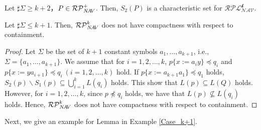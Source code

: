 \begin{col}
Let $\sharp\Sigma \ge k+2$，$P \in \mathcal{RP}^{+}_{N\!A\!V}$.
Then, $S_{2}(P)$ is a characteristic set for $\mathcal{RPL^{\mbox{$k$}}_{NAV}}$.
\end{col}

\begin{lem}\label{Case_k+2}\label{k+2のとき}
Let $\sharp\Sigma \le k+1$.
Then, $\mathcal{RP}^{k}_{N\!A\!V}$ does not have compactness with respect to containment.
\end{lem}
\begin{proof}
Let $\Sigma$ be the set of $k+1$ constant symbols $a_{1}, \ldots , a_{k+1}$, i.e., $\Sigma = \{ a_{1}, \ldots , a_{k+1} \}$.
We assume that for $i=1,2,\ldots,k$, $p \{ x := a_{i}y \} \preceq q_{i}$ and $p \{ x := ya_{i+1} \} \preceq q_{i}~(i=1,2, \ldots ,k)$ hold.
If $p \{ x:= a_{k+1}a_{1} \} \preceq q_{1}$ holds, $S_{2}(p) \backslash S_{1}(p) \subseteq \bigcup^{k}_{i=1} L(q_{i})$ holds.
This show that $L(p) \subseteq L(Q)$ holds.
However, for $i=1,2,\ldots,k$, since $p \not \preceq q_{i}$ holds, we have that $L(p) \not \subseteq L(q_{i})$ holds.
Hence, $\mathcal{RP}^{k}_{N\!A\!V}$ does not have compactness with respect to containment.
\end{proof}

Next, we give an example for Lemma \label{Case_k+2} in Example \ref{Case_k+1}.

